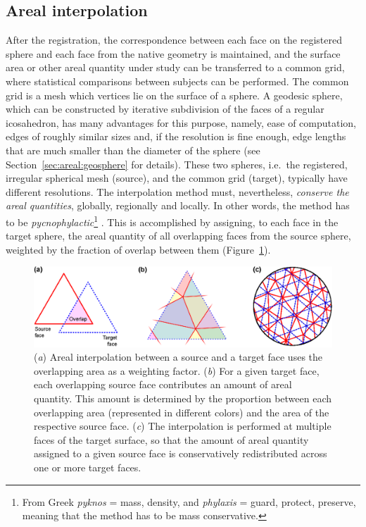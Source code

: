 \subsection{Areal interpolation}

After the registration, the correspondence between each face on the registered sphere and each face from the native geometry is maintained, and the surface area or other areal quantity under study can be transferred to a common grid, where statistical comparisons between subjects can be performed. The common grid is a mesh which vertices lie on the surface of a sphere. A geodesic sphere, which can be constructed by iterative subdivision of the faces of a regular icosahedron, has many advantages for this purpose, namely, ease of computation, edges of roughly similar sizes and, if the resolution is fine enough, edge lengths that are much smaller than the diameter of the sphere (see Section~\ref{sec:areal:geosphere} for details). These two spheres, i.e.\ the registered, irregular spherical mesh (source), and the common grid (target), typically have different resolutions. The interpolation method must, nevertheless, \emph{conserve the areal quantities}, globally, regionally and locally. In other words, the method has to be \emph{pycnophylactic}\footnote{From Greek \emph{pyknos} = mass, density, and \emph{phylaxis} = guard, protect, preserve, meaning that the method has to be mass conservative.} \citep{Tobler1979}. This is accomplished by assigning, to each face in the target sphere, the areal quantity of all overlapping faces from the source sphere, weighted by the fraction of overlap between them (Figure~\ref{fig:areal:triangles}).

\begin{figure}[!t]  %
\centering
\includegraphics[width=14cm]{images/triangles.eps}
\caption[Overlapping areas used to weight areal quantities during interpolation.]{(\emph{a}) Areal interpolation between a source and a target face uses the overlapping area as a weighting factor. (\emph{b}) For a given target face, each overlapping source face contributes an amount of areal quantity. This amount is determined by the proportion between each overlapping area (represented in different colors) and the area of the respective source face. (\emph{c}) The interpolation is performed at multiple faces of the target surface, so that the amount of areal quantity assigned to a given source face is conservatively redistributed across one or more target faces.}
\label{fig:areal:triangles}
\end{figure}

